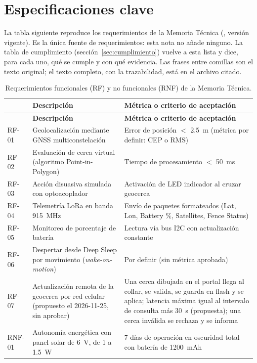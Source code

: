 \section{Especificaciones clave}

La tabla siguiente reproduce los requerimientos de la Memoria Técnica
(, versión vigente). Es la única fuente de requerimientos: esta nota no
añade ninguno. La tabla de cumplimiento (sección~\ref{sec:cumplimiento}) vuelve a esta lista y dice,
para cada uno, qué se cumple y con qué evidencia. Las frases entre comillas son el texto original; el
texto completo, con la trazabilidad, está en el archivo citado.

\begin{longtable}{|p{1.4cm} p{5.2cm} p{8.5cm}|}
\caption{Requerimientos funcionales (RF) y no funcionales (RNF) de la Memoria Técnica.}\\
\hline
\tablehead{\textbf{ID} & \textbf{Descripción} & \textbf{Métrica o criterio de aceptación}} \\ \hline
\endfirsthead
\hline
\tablehead{\textbf{ID} & \textbf{Descripción} & \textbf{Métrica o criterio de aceptación}} \\ \hline
\endhead
RF-01 & Geolocalización mediante GNSS multiconstelación & Error de posición $<$ 2.5~m (métrica por definir: CEP o RMS) \\ \hline
RF-02 & Evaluación de cerca virtual (algoritmo Point-in-Polygon) & Tiempo de procesamiento $<$ 50~ms \\ \hline
RF-03 & Acción disuasiva simulada con optoacoplador & Activación de LED indicador al cruzar geocerca \\ \hline
RF-04 & Telemetría LoRa en banda 915~MHz & Envío de paquetes formateados (Lat, Lon, Battery \%, Satellites, Fence Status) \\ \hline
RF-05 & Monitoreo de porcentaje de batería & Lectura vía bus I2C con actualización constante \\ \hline
RF-06 & Despertar desde Deep Sleep por movimiento (\emph{wake-on-motion}) & Por definir (sin métrica aprobada) \\ \hline
RF-07 & Actualización remota de la geocerca por red celular (propuesto el 2026-11-25, sin aprobar) & Una cerca dibujada en el portal llega al collar, se valida, se guarda en flash y se aplica; latencia máxima igual al intervalo de consulta más 30~s (propuesta); una cerca inválida se rechaza y se informa \\ \hline
RNF-01 & Autonomía energética con panel solar de 6~V, de 1 a 1.5~W & 7 días de operación en oscuridad total con batería de 1200~mAh \\ \hline

\end{longtable}
